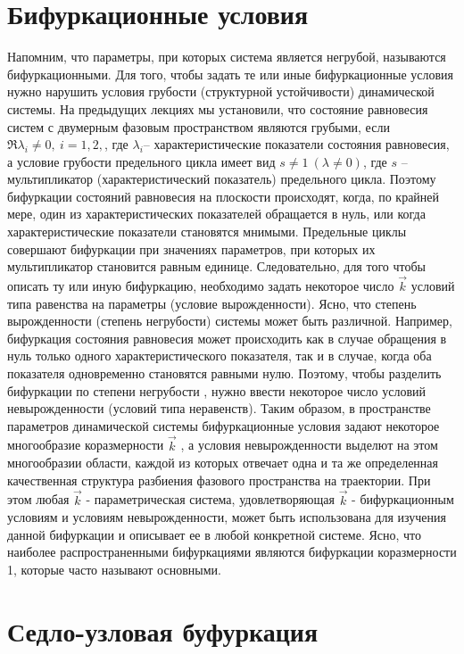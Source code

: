 \section{Бифуркационные условия}%
\label{sec:8.1}

Напомним, что параметры, при которых система является негрубой,
называются бифуркационными. Для того, чтобы задать те или иные
бифуркационные условия нужно нарушить условия грубости (структурной
устойчивости) динамической системы. На предыдущих лекциях мы
установили, что состояние равновесия систем с двумерным фазовым
пространством являются грубыми, если $\Re \lambda_i \neq 0,~ i=1,2,$, где $\lambda_i$--
характеристические показатели состояния равновесия, а условие грубости
предельного цикла имеет вид $s\neq 1 ~ (\lambda \neq 0)$, где $s$ – мультипликатор
(характеристический показатель) предельного цикла. Поэтому бифуркации
состояний равновесия на плоскости происходят, когда, по крайней мере, один
из характеристических показателей обращается в нуль, или когда
характеристические показатели становятся мнимыми. Предельные циклы
совершают бифуркации при значениях параметров, при которых их
мультипликатор становится равным единице. Следовательно, для того чтобы
описать ту или иную бифуркацию, необходимо задать некоторое число $\vec k$
условий типа равенства на параметры (условие вырожденности). Ясно, что
степень вырожденности (степень негрубости) системы может быть различной.
Например, бифуркация состояния равновесия может происходить как в случае
обращения в нуль только одного характеристического показателя, так и в
случае, когда оба показателя одновременно становятся равными нулю.
Поэтому, чтобы разделить бифуркации по степени негрубости , нужно ввести
некоторое число условий невырожденности (условий типа неравенств). Таким
образом, в пространстве параметров динамической системы бифуркационные
условия задают некоторое многообразие коразмерности $\vec k$ , а условия
невырожденности выделют на этом многообразии области, каждой из которых
отвечает одна и та же определенная качественная структура разбиения
фазового пространства на траектории. При этом любая $\vec k$ - параметрическая
система, удовлетворяющая $\vec k$ - бифуркационным условиям и условиям
невырожденности, может быть использована для изучения данной бифуркации
и описывает ее в любой конкретной системе. Ясно, что наиболее
распространенными бифуркациями являются бифуркации коразмерности 1,
которые часто называют основными.

\section{Седло-узловая буфуркация}%
\label{sec:8.2}

